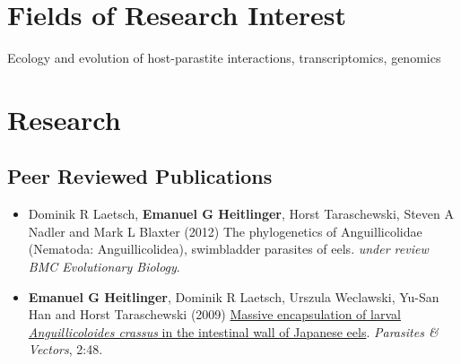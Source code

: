 \section*{Fields of Research Interest}

Ecology and evolution of host-parastite interactions, transcriptomics, genomics

\section*{Research}

\subsection*{Peer Reviewed Publications}

\begin{itemize}
\item Dominik R Laetsch, \textbf{Emanuel G Heitlinger}, Horst
  Taraschewski, Steven A Nadler and Mark L Blaxter (2012) The
  phylogenetics of Anguillicolidae (Nematoda: Anguillicolidea),
  swimbladder parasites of eels. \textit{under review} \textit{BMC
    Evolutionary Biology}.
\item \textbf{Emanuel G Heitlinger}, Dominik R Laetsch, Urszula
  Weclawski, Yu-San Han and Horst Taraschewski (2009)
  \href{http://www.parasitesandvectors.com/content/2/1/48}{Massive
    encapsulation of larval \textit{Anguillicoloides crassus} in the
    intestinal wall of Japanese eels}. \textit{Parasites \& Vectors},
  2:48.
\end{itemize}

%




